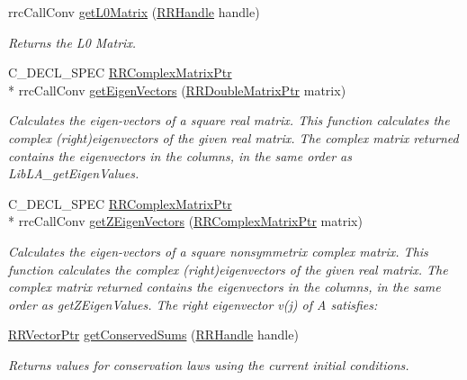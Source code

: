 \begin{DoxyCompactItemize}
rrc\-Call\-Conv \hyperlink{group___stoich_gabcc1c1d88e91e4c17888f63a1158fade}{get\-L0\-Matrix} (\hyperlink{rrc__types_8h_a1d68f0592372208fa5a5f2799ea4b3ae}{R\-R\-Handle} handle)
\begin{DoxyCompactList}\small\item\em Returns the L0 Matrix. \end{DoxyCompactList}\item 
C\-\_\-\-D\-E\-C\-L\-\_\-\-S\-P\-E\-C \hyperlink{rrc__types_8h_a8cf9e865d8541d100f153800adbb7c3f}{R\-R\-Complex\-Matrix\-Ptr} \\*
rrc\-Call\-Conv \hyperlink{group___stoich_ga0c68a334f896f419160f09e140c52a5b}{get\-Eigen\-Vectors} (\hyperlink{rrc__types_8h_ae586a879d30f0823087e42d93464b5dd}{R\-R\-Double\-Matrix\-Ptr} matrix)
\begin{DoxyCompactList}\small\item\em Calculates the eigen-\/vectors of a square real matrix. This function calculates the complex (right)eigenvectors of the given real matrix. The complex matrix returned contains the eigenvectors in the columns, in the same order as Lib\-L\-A\-\_\-get\-Eigen\-Values. \end{DoxyCompactList}\item 
C\-\_\-\-D\-E\-C\-L\-\_\-\-S\-P\-E\-C \hyperlink{rrc__types_8h_a8cf9e865d8541d100f153800adbb7c3f}{R\-R\-Complex\-Matrix\-Ptr} \\*
rrc\-Call\-Conv \hyperlink{group___stoich_ga5d823d9deca09548bf65c9df30bf0aac}{get\-Z\-Eigen\-Vectors} (\hyperlink{rrc__types_8h_a8cf9e865d8541d100f153800adbb7c3f}{R\-R\-Complex\-Matrix\-Ptr} matrix)
\begin{DoxyCompactList}\small\item\em Calculates the eigen-\/vectors of a square nonsymmetrix complex matrix. This function calculates the complex (right)eigenvectors of the given real matrix. The complex matrix returned contains the eigenvectors in the columns, in the same order as get\-Z\-Eigen\-Values. The right eigenvector v(j) of A satisfies\-: \end{DoxyCompactList}\item 
\hyperlink{rrc__types_8h_a3be72d6006034fd349f753d2bf441bf7}{R\-R\-Vector\-Ptr} \hyperlink{group___stoich_gaed6227a5e35be5cfdaf667ddb3f9afe9}{get\-Conserved\-Sums} (\hyperlink{rrc__types_8h_a1d68f0592372208fa5a5f2799ea4b3ae}{R\-R\-Handle} handle)
\begin{DoxyCompactList}\small\item\em Returns values for conservation laws using the current initial conditions. \end{DoxyCompactList}\end{DoxyCompactItemize}


